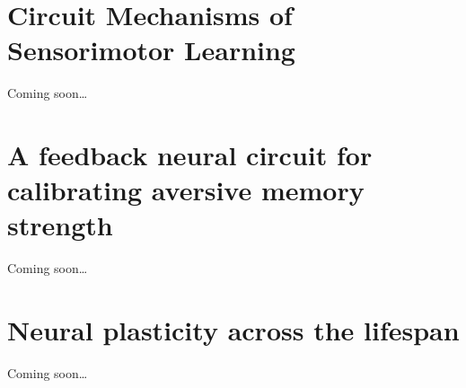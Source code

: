\documentclass[11pt, a4paper, oneside]{article}   	%
\begin{document}

\section{Circuit Mechanisms of Sensorimotor Learning \cite{Makino2016}}

Coming soon\ldots



\section{A feedback neural circuit for calibrating aversive memory strength \cite{Ozawa2016}}

Coming soon\ldots



\section{Neural plasticity across the lifespan \cite{Power2016}}

Coming soon\ldots

\end{document}
